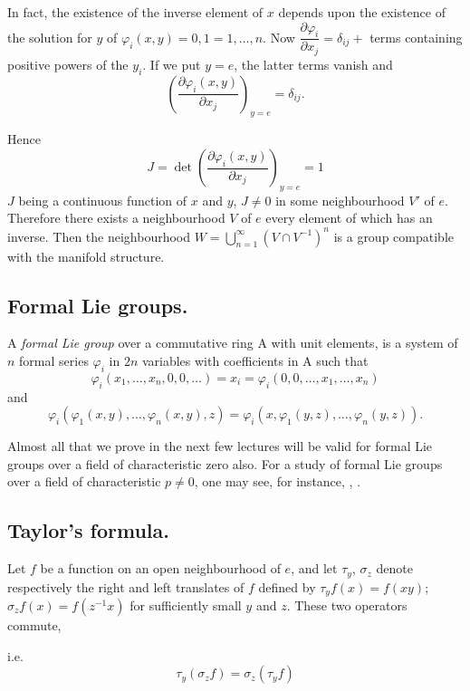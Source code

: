 In fact, the existence of the inverse element of $x$ depends upon the
existence of the solution for $y$ of $\varphi_i(x,y)=0, 1=1, \ldots ,
n$. Now $\dfrac {\partial \varphi_i}{\partial x_j}=\delta_{ij}+$ terms
containing positive powers of the $y_i$. If we put $y = e$, the latter
terms vanish and 
$$
\left( \frac{\partial \varphi_i (x,y)}{\partial x_j} \right)_{y=e}=
\delta_{ij}. 
$$

Hence\pageoriginale 
$$
J=\det \left(\dfrac {\partial \varphi_i
  (x,y)}{\partial x_j} \right)_{y=e}=1
$$ 
$J$ being a continuous function of $x$ and $y$, $J \neq 0$ in some
neighbourhood $V'$ of $e$. Therefore there exists a neighbourhood $V$
of $e$ every element of which has an inverse. Then the neighbourhood
$W= \bigcup^{\infty}_{n=1}(V\cap V^{-1})^n$ is a group
compatible with the manifold structure. 

\subsection{Formal Lie groups.}\label{chap2-sec2.3}%

\begin{defi*}
A {\em formal Lie group} over a commutative ring A with unit
elements, is a system of $n$ formal series $\varphi_i$ in $2n$
variables with coefficients in A such that 
$$
\varphi_i(x_1, \ldots , x_n, 0, 0, \ldots) = x_i = \varphi_i (0, 0,
\ldots , x_1, \ldots , x_n) 
$$ 
and
$$
\varphi_i(\varphi_1(x,y), \ldots , \varphi_n (x,y),z)= \varphi_i(x,
\varphi_1(y,z), \ldots , \varphi_n(y,z)). 
$$
\end{defi*}

Almost all that we prove in the next few lectures will be
valid for formal Lie groups over a field of characteristic zero
also. For a study of formal Lie groups over a field of characteristic
$p\neq 0$, one may see, for instance, \cite{key9}, \cite{key10}.  

\subsection{Taylor's formula.}\label{chap2-sec2.4}%

Let $f$ be a function on an open neighbourhood of $e$, and let
$\tau_y$, $\sigma_z$ denote respectively the right and left translates of
$f$ defined by $\tau_y f(x)=f(xy)$; $\sigma_z f(x) = f(z^{-1}x)$ for
sufficiently small $y$ and $z$. These two operators commute, 

i.e. 
$$
\tau_y (\sigma_z f) = \sigma_z(\tau_y f)
$$

